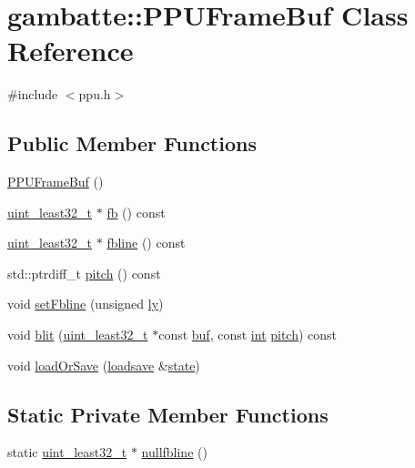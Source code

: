 \hypertarget{classgambatte_1_1PPUFrameBuf}{}\section{gambatte\+:\+:P\+P\+U\+Frame\+Buf Class Reference}
\label{classgambatte_1_1PPUFrameBuf}


{\ttfamily \#include $<$ppu.\+h$>$}

\subsection*{Public Member Functions}
\begin{DoxyCompactItemize}
\item 
\hyperlink{classgambatte_1_1PPUFrameBuf_aac16035ebd11d4d7c94c4cd3a6c64f76}{P\+P\+U\+Frame\+Buf} ()
\item 
\hyperlink{namespacegambatte_a0639f09fccfbbd5a8e0796318768e370}{uint\+\_\+least32\+\_\+t} $\ast$ \hyperlink{classgambatte_1_1PPUFrameBuf_a6d6f6dc400fdd3647e402986b7cfe3a7}{fb} () const
\item 
\hyperlink{namespacegambatte_a0639f09fccfbbd5a8e0796318768e370}{uint\+\_\+least32\+\_\+t} $\ast$ \hyperlink{classgambatte_1_1PPUFrameBuf_a63334566c8b1304cb65bebdb17ab808d}{fbline} () const
\item 
std\+::ptrdiff\+\_\+t \hyperlink{classgambatte_1_1PPUFrameBuf_a65a03c7145d081e2d35044e26a1f8816}{pitch} () const
\item 
void \hyperlink{classgambatte_1_1PPUFrameBuf_a56d01d25710eb23028ad458e17008419}{set\+Fbline} (unsigned \hyperlink{video_8cpp_ab1c1cf762ec2da5588c30a13cd60af91}{ly})
\item 
void \hyperlink{classgambatte_1_1PPUFrameBuf_ae48a732c58c23832d9fa59a53a052d6e}{blit} (\hyperlink{namespacegambatte_a0639f09fccfbbd5a8e0796318768e370}{uint\+\_\+least32\+\_\+t} $\ast$const \hyperlink{ioapi_8h_a8ad8a13c88886b9f623034ff88570adb}{buf}, const \hyperlink{ioapi_8h_a787fa3cf048117ba7123753c1e74fcd6}{int} \hyperlink{classgambatte_1_1PPUFrameBuf_a65a03c7145d081e2d35044e26a1f8816}{pitch}) const
\item 
void \hyperlink{classgambatte_1_1PPUFrameBuf_a1428b8c8a842e549798a77e54ed9dd32}{load\+Or\+Save} (\hyperlink{classgambatte_1_1loadsave}{loadsave} \&\hyperlink{ppu_8cpp_a2f2eca6997ee7baf8901725ae074d45b}{state})
\end{DoxyCompactItemize}
\subsection*{Static Private Member Functions}
\begin{DoxyCompactItemize}
\item 
static \hyperlink{namespacegambatte_a0639f09fccfbbd5a8e0796318768e370}{uint\+\_\+least32\+\_\+t} $\ast$ \hyperlink{classgambatte_1_1PPUFrameBuf_ad25aa01ec853833310caa7cdab389f7c}{nullfbline} ()
\end{DoxyCompactItemize}

